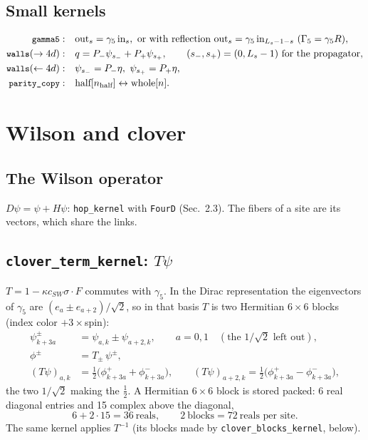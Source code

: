 \documentclass[11pt,a4paper]{article}
\numberwithin{equation}{section}
\newcommand{\code}[1]{\texttt{\small #1}}
\begin{document}
\subsection{Small kernels}

\begin{align}
\code{gamma5}:&\quad \text{out}_s = \gamma_5\,\text{in}_s,\ \text{or with reflection}\ \text{out}_s = \gamma_5\,\text{in}_{L_s-1-s}\ (\Gamma_5=\gamma_5R),\\
\code{walls} (\to4d):&\quad q = P_-\psi_{s_-} + P_+\psi_{s_+},\qquad (s_-,s_+)=(0,L_s-1)\ \text{for the propagator},\\
\code{walls} (\gets4d):&\quad \psi_{s_-} = P_-\eta,\ \psi_{s_+}=P_+\eta,\\
\code{parity\_copy}:&\quad \text{half}[n_{\text{half}}] \leftrightarrow \text{whole}[n].
\end{align}

\section{Wilson and clover}

\subsection{The Wilson operator}

$D\psi = \psi + H\psi$: \code{hop\_kernel} with \code{FourD} (Sec.~2.3). The fibers of a site are
its vectors, which share the links.

\subsection{\code{clover\_term\_kernel}: $T\psi$}

$T = 1-\kappa c_{SW}\sigma\cdot F$ commutes with $\gamma_5$. In the Dirac representation the
eigenvectors of $\gamma_5$ are $(e_a\pm e_{a+2})/\sqrt2$, so in that basis $T$ is two Hermitian
$6\times6$ blocks (index color $+3\times$spin):
\begin{align}
\psi^\pm_{k+3a} &= \psi_{a,k} \pm \psi_{a+2,k},\qquad a=0,1\quad(\text{the }1/\sqrt2\text{ left out}),\\
\phi^\pm &= T_\pm\,\psi^\pm,\\
(T\psi)_{a,k} &= \tfrac12\big(\phi^+_{k+3a} + \phi^-_{k+3a}\big),\qquad
(T\psi)_{a+2,k} = \tfrac12\big(\phi^+_{k+3a} - \phi^-_{k+3a}\big),
\end{align}
the two $1/\sqrt2$ making the $\tfrac12$. A Hermitian $6\times6$ block is stored packed: 6 real
diagonal entries and 15 complex above the diagonal,
\begin{equation}
6 + 2\cdot15 = 36\ \text{reals},\qquad 2\ \text{blocks} = 72\ \text{reals per site}.
\end{equation}
The same kernel applies $T^{-1}$ (its blocks made by \code{clover\_blocks\_kernel}, below).
\end{document}
